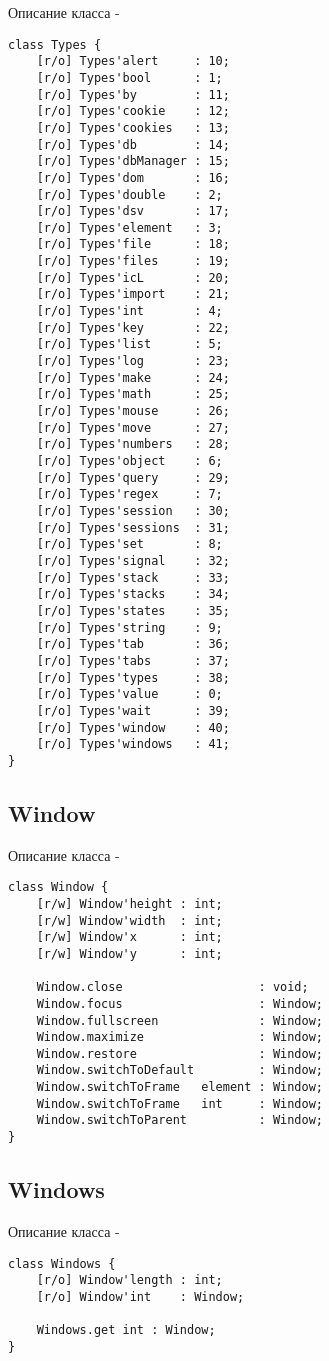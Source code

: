 \noindent Описание класса  -
\begin{lstlisting}[numbers=none]
class Types {
    [r/o] Types'alert     : 10;
	[r/o] Types'bool      : 1;
	[r/o] Types'by        : 11;
	[r/o] Types'cookie    : 12;
	[r/o] Types'cookies   : 13;
	[r/o] Types'db        : 14;
	[r/o] Types'dbManager : 15;
	[r/o] Types'dom       : 16;
	[r/o] Types'double    : 2;
	[r/o] Types'dsv       : 17;
	[r/o] Types'element   : 3;
	[r/o] Types'file      : 18;
	[r/o] Types'files     : 19;
	[r/o] Types'icL       : 20;
	[r/o] Types'import    : 21;
	[r/o] Types'int       : 4;
	[r/o] Types'key       : 22;
	[r/o] Types'list      : 5;
	[r/o] Types'log       : 23;
	[r/o] Types'make      : 24;
	[r/o] Types'math      : 25;
	[r/o] Types'mouse     : 26;
	[r/o] Types'move      : 27;
	[r/o] Types'numbers   : 28;
	[r/o] Types'object    : 6;
	[r/o] Types'query     : 29;
	[r/o] Types'regex     : 7;
	[r/o] Types'session   : 30;
	[r/o] Types'sessions  : 31;
	[r/o] Types'set       : 8;
	[r/o] Types'signal    : 32;
	[r/o] Types'stack     : 33;
	[r/o] Types'stacks    : 34;
	[r/o] Types'states    : 35;
	[r/o] Types'string    : 9;
	[r/o] Types'tab       : 36;
	[r/o] Types'tabs      : 37;
	[r/o] Types'types     : 38;
	[r/o] Types'value     : 0;
	[r/o] Types'wait      : 39;
	[r/o] Types'window    : 40;
	[r/o] Types'windows   : 41;
}
\end{lstlisting}

\subsection{{\color{orange} Window}}

\noindent Описание класса  -
\begin{lstlisting}[numbers=none]
class Window {
    [r/w] Window'height : int;
	[r/w] Window'width  : int;
	[r/w] Window'x      : int;
	[r/w] Window'y      : int;
	
    Window.close                   : void;
	Window.focus                   : Window;
	Window.fullscreen              : Window;
	Window.maximize                : Window;
	Window.restore                 : Window;
	Window.switchToDefault         : Window;
	Window.switchToFrame   element : Window;
	Window.switchToFrame   int     : Window;
	Window.switchToParent          : Window;
}
\end{lstlisting}

\subsection{{\color{orange} Windows}}

\noindent Описание класса  -
\begin{lstlisting}[numbers=none]
class Windows {
    [r/o] Window'length : int;
	[r/o] Window'int    : Window;
	
    Windows.get int : Window;
}
\end{lstlisting}


